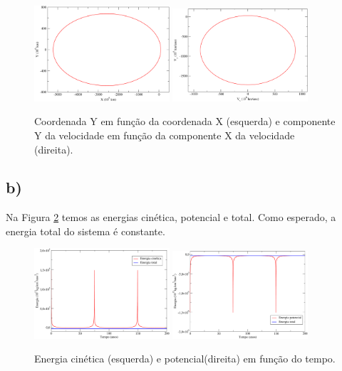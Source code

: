 \documentclass[a4wide]{report}
\begin{document}
\begin{figure}[!htb]
\centering
\includegraphics[width=0.447\textwidth]{xy.pdf}
\includegraphics[width=0.447\textwidth]{vxvy.pdf}
\caption{Coordenada Y em função da coordenada X (esquerda) e componente Y da velocidade em função da componente X da velocidade (direita).}
\label{3a3}
\end{figure}


\subsection*{b)}
Na Figura \ref{3b1} temos as energias cinética, potencial e total. Como esperado, a energia total do sistema é constante.
\begin{figure}[!htb]
\centering
\includegraphics[width=0.447\textwidth]{K.pdf}
\includegraphics[width=0.447\textwidth]{U.pdf}
\caption{Energia cinética (esquerda) e potencial(direita) em função do tempo.}
\label{3b1}
\end{figure}
\end{document}
